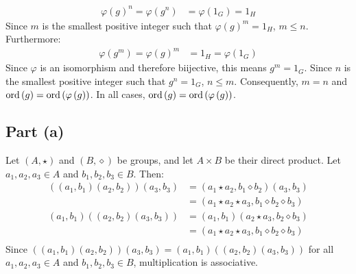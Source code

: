 \documentclass{article}
\begin{document}
\begin{equation}
    \begin{split}
        \varphi\left(g\right)^n = \varphi\left(g^n\right) & = \varphi\left(1_G\right) = 1_H
    \end{split}
\end{equation}
Since $m$ is the smallest positive integer such that $\varphi\left(g\right)^m = 1_H$, $m \leq n$. Furthermore:
\begin{equation}
    \begin{split}
        \varphi\left(g^m\right) = \varphi\left(g\right)^m & = 1_H = \varphi\left(1_G\right)
    \end{split}
\end{equation}
Since  $\varphi$ is an isomorphism and therefore biijective, this means $g^m = 1_G$. Since $n$ is the smallest positive integer such that $g^n = 1_G$, $n \leq m$. Consequently, $m = n$ and $\operatorname{ord}\left(g\right) = \operatorname{ord}\left(\varphi\left(g\right)\right)$. In all cases, $\operatorname{ord}\left(g\right) = \operatorname{ord}\left(\varphi\left(g\right)\right)$.

\clearpage

\problem
\subsection*{Part (a)}
Let $\left(A,\star\right)$ and $\left(B, \diamond\right)$ be groups, and let $A\times B$ be their direct product. Let $a_1, a_2, a_3 \in A$ and $b_1, b_2, b_3 \in B$. Then:
\begin{equation}
    \begin{split}
        \left(\left(a_1,b_1\right)\left(a_2,b_2\right)\right)\left(a_3,b_3\right) & = \left(a_1 \star a_2, b_1 \diamond b_2\right)\left(a_3,b_3\right) \\
        & = \left(a_1 \star a_2  \star a_3, b_1 \diamond b_2 \diamond b_3\right) \\
        \left(a_1,b_1\right)\left(\left(a_2,b_2\right)\left(a_3,b_3\right)\right) & = \left(a_1, b_1\right)\left(a_2 \star a_3, b_2 \diamond b_3\right) \\
        & = \left(a_1 \star a_2  \star a_3, b_1 \diamond b_2 \diamond b_3\right) \\
    \end{split}
\end{equation}
Since $\left(\left(a_1,b_1\right)\left(a_2,b_2\right)\right)\left(a_3,b_3\right) = \left(a_1,b_1\right)\left(\left(a_2,b_2\right)\left(a_3,b_3\right)\right)$ for all $a_1, a_2, a_3 \in A$ and $b_1, b_2, b_3 \in B$, multiplication is associative.
\end{document}
